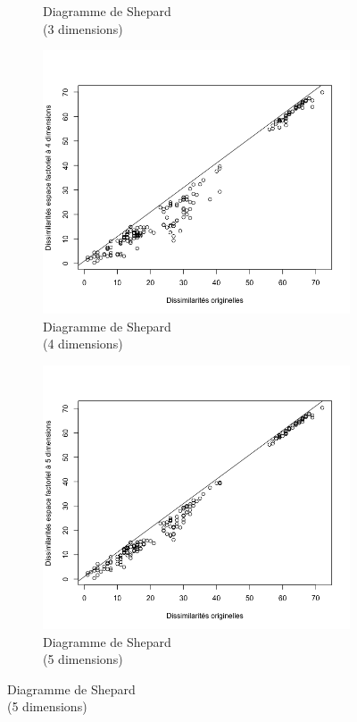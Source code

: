 \documentclass[a4paper,10pt]{report}
\begin{document}
\begin{figure}[H]
\begin{subfigure}[b]{0.25\linewidth}
		\caption{\small Diagramme de Shepard\\(3 dimensions)}
		\label{fig:1-mut-acp-aftd-diag-shepard-3-dim}
	\end{subfigure}%
	\begin{subfigure}[b]{0.25\linewidth}
		\centering
		\captionsetup{justification=centering}
		\includegraphics[width=1\linewidth]{img/1-mut-acp-aftd-diag-shepard-4-dim}
		\caption{\small Diagramme de Shepard\\(4 dimensions)}
		\label{fig:1-mut-acp-aftd-diag-shepard-4-dim}
	\end{subfigure}%
	\begin{subfigure}[b]{0.25\linewidth}
		\centering
		\captionsetup{justification=centering}
		\includegraphics[width=1\linewidth]{img/1-mut-acp-aftd-diag-shepard-5-dim}
		\caption{\small Diagramme de Shepard\\(5 dimensions)}
		\label{fig:1-mut-acp-aftd-diag-shepard-5-dim}
	\end{subfigure}%
	\label{fig:1-mut-acp-aftd-diag-shepard}%
\end{figure}
\end{document}
